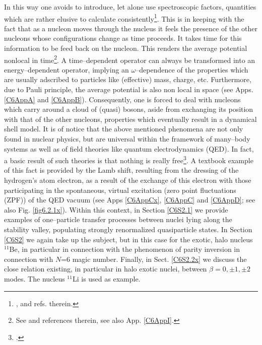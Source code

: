 In this way one avoids to introduce, let alone use spectroscopic factors, quantities which are rather elusive to calculate consistently\footnote{ \cite{Duguet:12,Jenning:11,Dickhoff:04,Dickhoff:05}, and refs. therein.}. This is in keeping with the fact that as a nucleon moves through the nucleus it feels the presence of the other nucleons whose configurations change as time proceeds. It takes time for this information to be feed back on the nucleon. This renders the average potential nonlocal in time\footnote{See \citet{Mahaux:85} and references therein, see also App. \ref{C6AppI}.}. A time--dependent operator can always be transformed into an energy--dependent operator, implying an $\omega$--dependence of the properties which are usually adscribed to particles like (effective) mass, charge, etc. Furthermore, due to  Pauli principle, the average potential is also non local in space (see Apps. \ref{C6AppA} and \ref{C6AppB}).  Consequently, one is forced to deal with nucleons which carry around a cloud of (quasi) bosons, aside from  exchanging its position with that of the other nucleons, properties which eventually result in a dynamical shell model.  It is of notice that the above mentioned phenomena are not only found in nuclear physics, but are universal within the framework of many--body systems as well as of field theories like quantum electrodynamics (QED). In fact, a basic result of such theories is that nothing is really free\footnote{\cite{Feynman:75}.}. A textbook example of this fact is provided by the Lamb shift, resulting from the dressing of the hydrogen's atom electron, as a result of the exchange of this electron with those participating in the spontaneous, virtual excitation (zero point fluctuations (ZPF)) of the QED vacuum (see Apps \ref{C6AppCx}, \ref{C6AppC} and \ref{C6AppD}; see also Fig. \ref{fig6.2.1x}).  Within this context, in Section \ref{C6S2.1} we provide examples of one--particle transfer processes between nuclei lying along the stability valley, populating strongly renormalized quasiparticle states.
In Section \ref{C6S2}  we again take up the subject, but in this case for the exotic, halo nucleus $^{11}$Be, in particular in connection with the   phenomenon of parity inversion in connection with  $N$=6 magic number. Finally, in Sect. \ref{C6S2.2x} we discuss the close relation existing, in particular in halo exotic nuclei, between $\beta=0,\pm1,\pm2$ modes. The nucleus $^{11}$Li is used as example.



